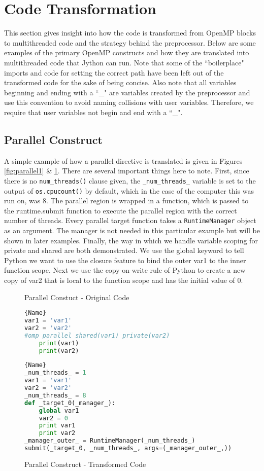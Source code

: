 \documentclass[letterpaper,12pt]{article} %
\begin{document}
\section{Code Transformation}
This section gives insight into how the code is transformed from OpenMP blocks to multithreaded code and the strategy behind the preprocessor. Below are some examples of the primary OpenMP constructs and how they are translated into multithreaded code that Jython can run. Note that some of the ``boilerplace" imports and code for setting the correct path have been left out of the transformed code for the sake of being concise. Also note that all variables beginning and ending with a ``\_" are variables created by the preprocessor and use this convention to avoid naming collisions with user variables. Therefore, we require that user variables not begin and end with a ``\_".

\subsection{Parallel Construct}
A simple example of how a parallel directive is translated is given in Figures \ref{fig:parallel1} \& \ref{fig:parallel2}. There are several important things here to note. First, since there is no \texttt{num\_threads()} clause given, the \texttt{\_num\_threads\_} variable is set to the output of \texttt{os.cpucount()} by default, which in the case of the computer this was run on, was 8. The parallel region is wrapped in a function, which is passed to the runtime.submit function to execute the parallel region with the correct number of threads. Every parallel target function takes a \texttt{RuntimeManager} object as an argument. The manager is not needed in this particular example but will be shown in later examples. Finally, the way in which we handle variable scoping for private and shared are both demonstrated. We use the global keyword to tell Python we want to use the closure feature to bind the outer var1 to the inner function scope. Next we use the copy-on-write rule of Python to create a new copy of var2 that is local to the function scope and has the initial value of 0.  


\begin{figure}[H]
\caption{Parallel Constuct - Original Code}
\label{fig:parallel1}
\begin{lstlisting}[language=Python]{Name}
var1 = 'var1'
var2 = 'var2'
#omp parallel shared(var1) private(var2)
    print(var1)
    print(var2)
\end{lstlisting}

\caption{Parallel Construct - Transformed Code}
\label{fig:parallel2}
\begin{lstlisting}[language=Python]{Name}
_num_threads_ = 1
var1 = 'var1'
var2 = 'var2'
_num_threads_ = 8
def _target_0(_manager_):
    global var1
    var2 = 0
    print var1
    print var2
_manager_outer_ = RuntimeManager(_num_threads_)
submit(_target_0, _num_threads_, args=(_manager_outer_,))
\end{lstlisting}
\end{figure}
\end{document}
